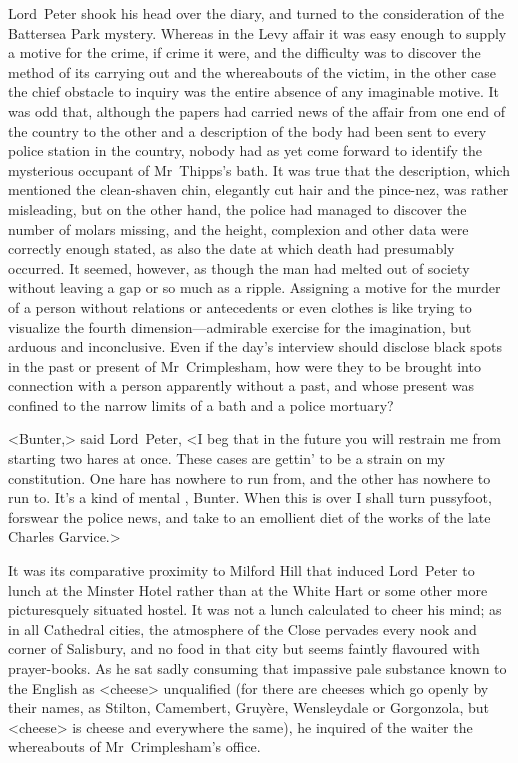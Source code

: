 Lord~Peter shook his head over the diary, and turned to the consideration of the Battersea Park mystery. Whereas in the Levy affair it was easy enough to supply a motive for the crime, if crime it were, and the difficulty was to discover the method of its carrying out and the whereabouts of the victim, in the other case the chief obstacle to inquiry was the entire absence of any imaginable motive. It was odd that, although the papers had carried news of the affair from one end of the country to the other and a description of the body had been sent to every police station in the country, nobody had as yet come forward to identify the mysterious occupant of Mr~Thipps's bath. It was true that the description, which mentioned the clean-shaven chin, elegantly cut hair and the pince-nez, was rather misleading, but on the other hand, the police had managed to discover the number of molars missing, and the height, complexion and other data were correctly enough stated, as also the date at which death had presumably occurred. It seemed, however, as though the man had melted out of society without leaving a gap or so much as a ripple. Assigning a motive for the murder of a person without relations or antecedents or even clothes is like trying to visualize the fourth dimension—admirable exercise for the imagination, but arduous and inconclusive. Even if the day's interview should disclose black spots in the past or present of Mr~Crimplesham, how were they to be brought into connection with a person apparently without a past, and whose present was confined to the narrow limits of a bath and a police mortuary?

<Bunter,> said Lord~Peter, <I beg that in the future you will restrain me from starting two hares at once. These cases are gettin' to be a strain on my constitution. One hare has nowhere to run from, and the other has nowhere to run to. It's a kind of mental , Bunter. When this is over I shall turn pussyfoot, forswear the police news, and take to an emollient diet of the works of the late Charles Garvice.>

It was its comparative proximity to Milford Hill that induced Lord~Peter to lunch at the Minster Hotel rather than at the White Hart or some other more picturesquely situated hostel. It was not a lunch calculated to cheer his mind; as in all Cathedral cities, the atmosphere of the Close pervades every nook and corner of Salisbury, and no food in that city but seems faintly flavoured with prayer-books. As he sat sadly consuming that impassive pale substance known to the English as <cheese> unqualified (for there are cheeses which go openly by their names, as Stilton, Camembert, Gruyère, Wensleydale or Gorgonzola, but <cheese> is cheese and everywhere the same), he inquired of the waiter the whereabouts of Mr~Crimplesham's office.

